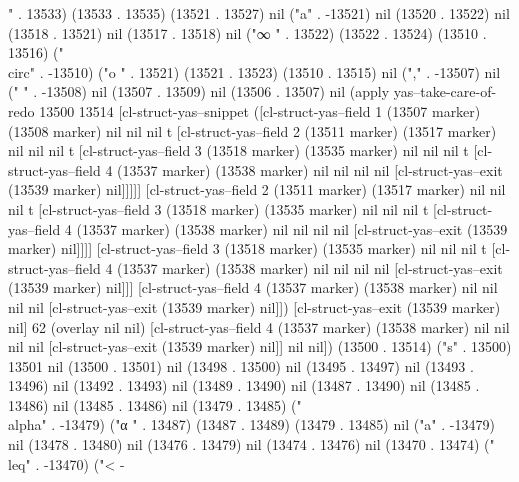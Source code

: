 {" . 13533) (13533 . 13535) (13521 . 13527) nil ("a" . -13521) nil (13520 . 13522) nil (13518 . 13521) nil (13517 . 13518) nil ("∞
" . 13522) (13522 . 13524) (13510 . 13516) ("\\circ" . -13510) ("o
" . 13521) (13521 . 13523) (13510 . 13515) nil ("," . -13507) nil (" " . -13508) nil (13507 . 13509) nil (13506 . 13507) nil (apply yas--take-care-of-redo 13500 13514 [cl-struct-yas--snippet ([cl-struct-yas--field 1 (13507 marker) (13508 marker) nil nil nil t [cl-struct-yas--field 2 (13511 marker) (13517 marker) nil nil nil t [cl-struct-yas--field 3 (13518 marker) (13535 marker) nil nil nil t [cl-struct-yas--field 4 (13537 marker) (13538 marker) nil nil nil nil [cl-struct-yas--exit (13539 marker) nil]]]]] [cl-struct-yas--field 2 (13511 marker) (13517 marker) nil nil nil t [cl-struct-yas--field 3 (13518 marker) (13535 marker) nil nil nil t [cl-struct-yas--field 4 (13537 marker) (13538 marker) nil nil nil nil [cl-struct-yas--exit (13539 marker) nil]]]] [cl-struct-yas--field 3 (13518 marker) (13535 marker) nil nil nil t [cl-struct-yas--field 4 (13537 marker) (13538 marker) nil nil nil nil [cl-struct-yas--exit (13539 marker) nil]]] [cl-struct-yas--field 4 (13537 marker) (13538 marker) nil nil nil nil [cl-struct-yas--exit (13539 marker) nil]]) [cl-struct-yas--exit (13539 marker) nil] 62 (overlay nil nil) [cl-struct-yas--field 4 (13537 marker) (13538 marker) nil nil nil nil [cl-struct-yas--exit (13539 marker) nil]] nil nil]) (13500 . 13514) ("s" . 13500) 13501 nil (13500 . 13501) nil (13498 . 13500) nil (13495 . 13497) nil (13493 . 13496) nil (13492 . 13493) nil (13489 . 13490) nil (13487 . 13490) nil (13485 . 13486) nil (13485 . 13486) nil (13479 . 13485) ("\\alpha" . -13479) ("α
" . 13487) (13487 . 13489) (13479 . 13485) nil ("a" . -13479) nil (13478 . 13480) nil (13476 . 13479) nil (13474 . 13476) nil (13470 . 13474) ("\\leq" . -13470) ("<
-
}
